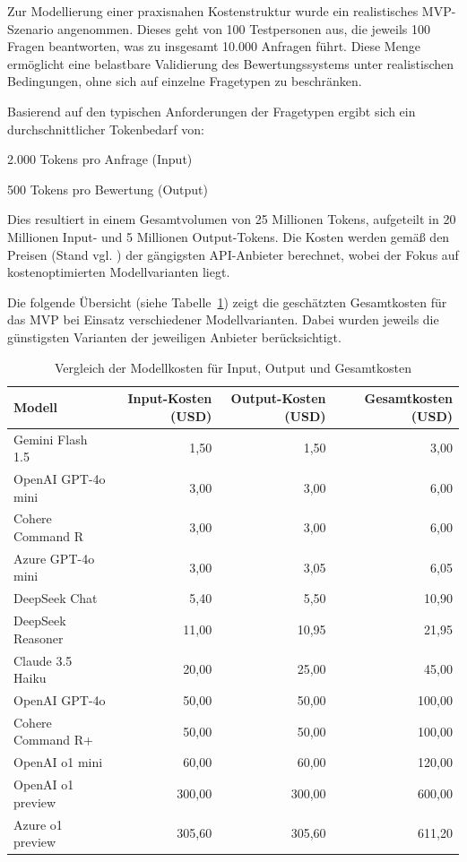 \documentclass[a4paper,12pt]{article}
\begin{document}
Zur Modellierung einer praxisnahen Kostenstruktur wurde ein realistisches MVP-Szenario angenommen. Dieses geht von 100 Testpersonen aus, die jeweils 100 Fragen beantworten, was zu insgesamt 10.000 Anfragen führt. Diese Menge ermöglicht eine belastbare Validierung des Bewertungssystems unter realistischen Bedingungen, ohne sich auf einzelne Fragetypen zu beschränken.

Basierend auf den typischen Anforderungen der Fragetypen ergibt sich ein durchschnittlicher Tokenbedarf von:

2.000 Tokens pro Anfrage (Input)

500 Tokens pro Bewertung (Output)

Dies resultiert in einem Gesamtvolumen von 25 Millionen Tokens, aufgeteilt in 20 Millionen Input- und 5 Millionen Output-Tokens. Die Kosten werden gemäß den Preisen (Stand vgl. \textcite{openai,gemini,cohere,claude,azure,deepseek}) der gängigsten API-Anbieter berechnet, wobei der Fokus auf kostenoptimierten Modellvarianten liegt.

Die folgende Übersicht (siehe Tabelle~\ref{tab:modellkosten}) zeigt die geschätzten Gesamtkosten für das MVP bei Einsatz verschiedener Modellvarianten. Dabei wurden jeweils die günstigsten Varianten der jeweiligen Anbieter berücksichtigt.

\begin{table}[ht]
    \centering
    \small
    \begin{tabular}{|l|r|r|r|}
        \hline
        \textbf{Modell} & \textbf{Input-Kosten (USD)} & \textbf{Output-Kosten (USD)} & \textbf{Gesamtkosten (USD)} \\
        \hline
        Gemini Flash 1.5 & 1{,}50 & 1{,}50 & 3{,}00 \\
        OpenAI GPT-4o mini & 3{,}00 & 3{,}00 & 6{,}00 \\
        Cohere Command R & 3{,}00 & 3{,}00 & 6{,}00 \\
        Azure GPT-4o mini & 3{,}00 & 3{,}05 & 6{,}05 \\
        DeepSeek Chat & 5{,}40 & 5{,}50 & 10{,}90 \\
        DeepSeek Reasoner & 11{,}00 & 10{,}95 & 21{,}95 \\
        Claude 3.5 Haiku & 20{,}00 & 25{,}00 & 45{,}00 \\
        OpenAI GPT-4o & 50{,}00 & 50{,}00 & 100{,}00 \\
        Cohere Command R+ & 50{,}00 & 50{,}00 & 100{,}00 \\
        OpenAI o1 mini & 60{,}00 & 60{,}00 & 120{,}00 \\
        OpenAI o1 preview & 300{,}00 & 300{,}00 & 600{,}00 \\
        Azure o1 preview & 305{,}60 & 305{,}60 & 611{,}20 \\
        \hline
    \end{tabular}
    \caption{Vergleich der Modellkosten für Input, Output und Gesamtkosten}
    \label{tab:modellkosten}
\end{table}
\end{document}
